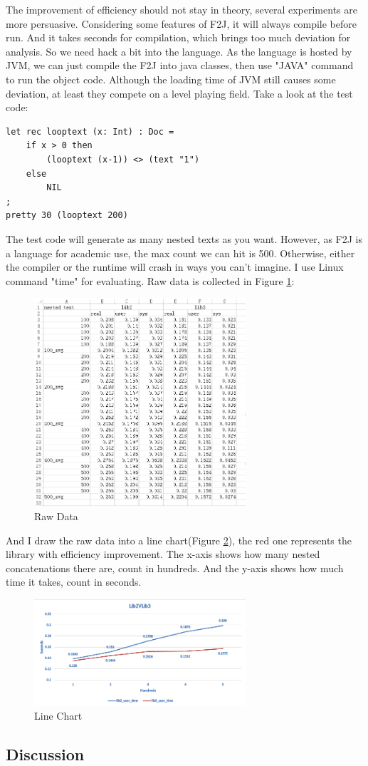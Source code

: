 The improvement of efficiency should not stay in theory, several experiments are more persuasive. Considering some features of F2J, it will always compile before run. And it takes seconds for compilation, which brings too much deviation for analysis. So we need hack a bit into the language. As the language is hosted by JVM, we can just compile the F2J into java classes, then use "JAVA" command to run the object code. Although the loading time of JVM still causes some deviation, at least they compete on a level playing field. Take a look at the test code:
\begin{lstlisting}
let rec looptext (x: Int) : Doc =
    if x > 0 then
        (looptext (x-1)) <> (text "1")
    else
        NIL
;
pretty 30 (looptext 200)
\end{lstlisting}

The test code will generate as many nested texts as you want. However, as F2J is a language for academic use, the max count we can hit is 500. Otherwise, either the compiler or the runtime will crash in ways you can't imagine. I use Linux command "time" for evaluating. Raw data is collected in Figure \ref{fig:efficiency comparation}:
\begin{figure}[h!]
    \centering
    \includegraphics[width=0.7\textwidth]{imgs/raw_data}
    \caption{Raw Data}
    \label{fig:efficiency comparation}
\end{figure}
And I draw the raw data into a line chart(Figure \ref{fig:efficiency line chart}), the red one represents the library with efficiency improvement. The x-axis shows how many nested concatenations there are, count in hundreds. And the y-axis shows how much time it takes, count in seconds.
\begin{figure}[h!]
    \centering
    \includegraphics[width=0.7\textwidth]{imgs/compare}
    \caption{Line Chart}
    \label{fig:efficiency line chart}
\end{figure}

\subsection{Discussion}
